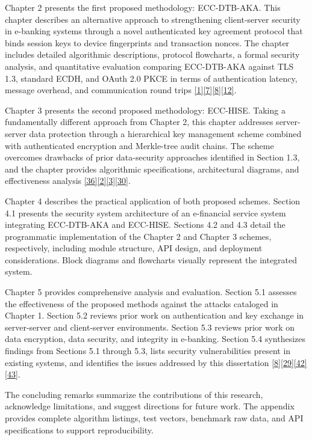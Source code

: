 \indent Chapter 2 presents the first proposed methodology: ECC-DTB-AKA. This chapter describes an alternative approach to strengthening client-server security in e-banking systems through a novel authenticated key agreement protocol that binds session keys to device fingerprints and transaction nonces. The chapter includes detailed algorithmic descriptions, protocol flowcharts, a formal security analysis, and quantitative evaluation comparing ECC-DTB-AKA against TLS 1.3, standard ECDH, and OAuth 2.0 PKCE in terms of authentication latency, message overhead, and communication round trips \hyperref[ref:1]{[1]}\hyperref[ref:7]{[7]}\hyperref[ref:8]{[8]}\hyperref[ref:12]{[12]}.

\indent Chapter 3 presents the second proposed methodology: ECC-HISE. Taking a fundamentally different approach from Chapter 2, this chapter addresses server-server data protection through a hierarchical key management scheme combined with authenticated encryption and Merkle-tree audit chains. The scheme overcomes drawbacks of prior data-security approaches identified in Section 1.3, and the chapter provides algorithmic specifications, architectural diagrams, and effectiveness analysis \hyperref[ref:36]{[36]}\hyperref[ref:2]{[2]}\hyperref[ref:3]{[3]}\hyperref[ref:30]{[30]}.

\indent Chapter 4 describes the practical application of both proposed schemes. Section 4.1 presents the security system architecture of an e-financial service system integrating ECC-DTB-AKA and ECC-HISE. Sections 4.2 and 4.3 detail the programmatic implementation of the Chapter 2 and Chapter 3 schemes, respectively, including module structure, API design, and deployment considerations. Block diagrams and flowcharts visually represent the integrated system.

\indent Chapter 5 provides comprehensive analysis and evaluation. Section 5.1 assesses the effectiveness of the proposed methods against the attacks cataloged in Chapter 1. Section 5.2 reviews prior work on authentication and key exchange in server-server and client-server environments. Section 5.3 reviews prior work on data encryption, data security, and integrity in e-banking. Section 5.4 synthesizes findings from Sections 5.1 through 5.3, lists security vulnerabilities present in existing systems, and identifies the issues addressed by this dissertation \hyperref[ref:8]{[8]}\hyperref[ref:29]{[29]}\hyperref[ref:42]{[42]}\hyperref[ref:43]{[43]}.

\indent The concluding remarks summarize the contributions of this research, acknowledge limitations, and suggest directions for future work. The appendix provides complete algorithm listings, test vectors, benchmark raw data, and API specifications to support reproducibility.

